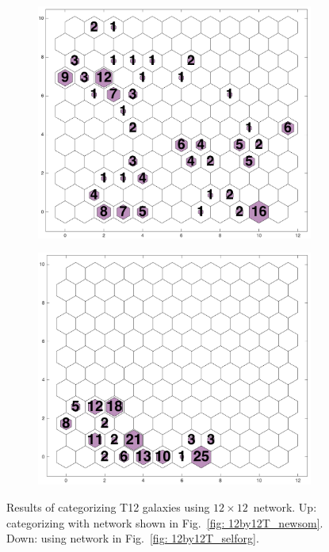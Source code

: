        \begin{figure}
        \begin{subfigure}[b]{0.5\textwidth}
            \centering
            \includegraphics[width=\textwidth]{../images0.01/2d/hit_v_12_by_12.png}
        \end{subfigure}
        \hfill
        \begin{subfigure}[b]{0.5\textwidth}
            \includegraphics[width=\textwidth]{../images0.01/2d/hit_v_12_by_self_org_res12.png}
        \end{subfigure}
        \caption{Results of categorizing T12 galaxies using $12\times12$~network. Up: categorizing with network shown in Fig.~\ref{fig: 12by12T_newsom}. Down: using network in Fig.~\ref{fig: 12by12T_selforg}.}
        \label{fig: 12by12V}
    \end{figure} 
    

